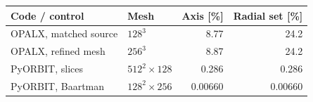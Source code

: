 \begin{tabular}{llrr}
\toprule
Code / control & Mesh & Axis [\%] & Radial set [\%] \\
\midrule
OPALX, matched source & $128^3$ & 8.77 & 24.2 \\
OPALX, refined mesh & $256^3$ & 8.87 & 24.2 \\
PyORBIT, slices & $512^2\!\times\!128$ & 0.286 & 0.286 \\
PyORBIT, Baartman & $128^2\!\times\!256$ & 0.00660 & 0.00660 \\
\bottomrule
\end{tabular}
